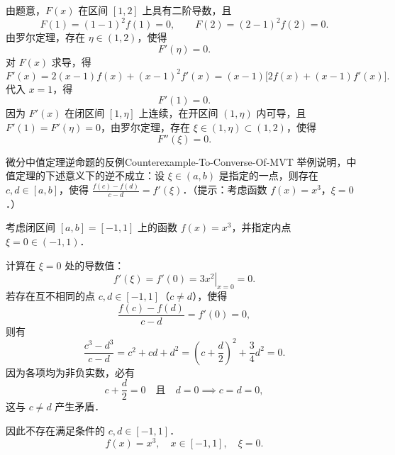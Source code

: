 \begin{myproof}
    由题意，$F(x)$ 在区间 $[1, 2]$ 上具有二阶导数，且
    \begin{equation}
        F(1) = (1-1)^2 f(1) = 0, \qquad F(2) = (2-1)^2 f(2) = 0.
    \end{equation}
    由罗尔定理，存在 $\eta \in (1, 2)$，使得
    \begin{equation}
        F'(\eta) = 0.
    \end{equation}
    对 $F(x)$ 求导，得
    \begin{equation}
        F'(x) = 2(x-1)f(x) + (x-1)^2 f'(x) = (x-1)\bigl[ 2f(x) + (x-1)f'(x) \bigr].
    \end{equation}
    代入 $x = 1$，得
    \begin{equation}
        F'(1) = 0.
    \end{equation}
    因为 $F'(x)$ 在闭区间 $[1, \eta]$ 上连续，在开区间 $(1, \eta)$ 内可导，且 $F'(1) = F'(\eta) = 0$，由罗尔定理，存在 $\xi \in (1, \eta) \subset (1, 2)$，使得
    \begin{equation}
        F''(\xi) = 0.
    \end{equation}
\end{myproof}

\begin{problem}{微分中值定理逆命题的反例}{Counterexample-To-Converse-Of-MVT}
    举例说明，中值定理的下述意义下的逆不成立：设 $\xi \in (a, b)$ 是指定的一点，则存在 $c, d \in [a, b]$，使得 $\frac{f(c)-f(d)}{c-d} = f'(\xi)$．（提示：考虑函数 $f(x) = x^3$，$\xi = 0$．）
\end{problem}

\begin{solution}
    考虑闭区间 $[a, b] = [-1, 1]$ 上的函数 $f(x) = x^3$，并指定内点 $\xi = 0 \in (-1, 1)$．

    计算在 $\xi = 0$ 处的导数值：
    \begin{equation}
        f'(\xi) = f'(0) = \left. 3x^2 \right|_{x=0} = 0.
    \end{equation}
    若存在互不相同的点 $c, d \in [-1, 1]$（$c \neq d$），使得
    \begin{equation}
        \frac{f(c) - f(d)}{c - d} = f'(0) = 0,
    \end{equation}
    则有
    \begin{equation}
        \frac{c^3 - d^3}{c - d} = c^2 + cd + d^2 = \left( c + \frac{d}{2} \right)^2 + \frac{3}{4}d^2 = 0.
    \end{equation}
    因为各项均为非负实数，必有
    \begin{equation}
        c + \frac{d}{2} = 0 \quad \text{且} \quad d = 0 \implies c = d = 0,
    \end{equation}
    这与 $c \neq d$ 产生矛盾．

    因此不存在满足条件的 $c, d \in [-1, 1]$．
    \begin{equation}
        \boxed{f(x) = x^3, \quad x \in [-1, 1], \quad \xi = 0.}
    \end{equation}
\end{solution}

